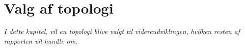 \chapter{Valg af topologi}\label{kap:topologi}

\emph{I dette kapitel, vil en topologi blive valgt til videreudviklingen, hvilken resten af rapporten vil handle om.}